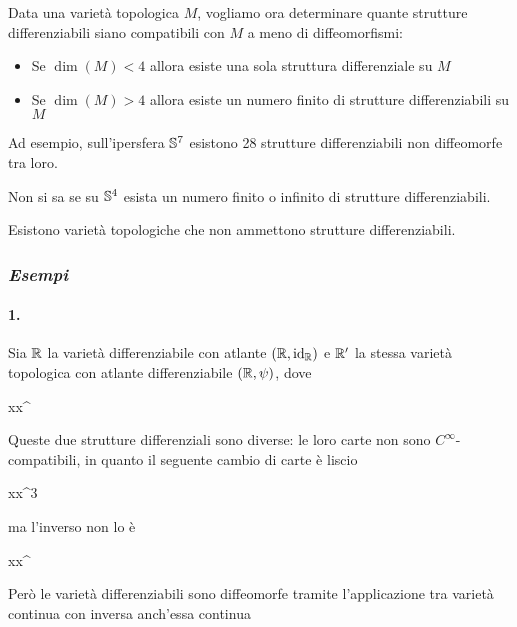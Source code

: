 Data una varietà topologica $ M $, vogliamo ora determinare quante strutture differenziabili siano compatibili con $ M $ a meno di diffeomorfismi:

\begin{itemize}
	\item Se $ \dim(M) < 4 $ allora esiste una sola struttura differenziale su $ M $
	
	\item Se $ \dim(M) > 4 $ allora esiste un numero finito di strutture differenziabili su $ M $
\end{itemize}

Ad esempio, sull'ipersfera $ \S^{7} $ esistono 28 strutture differenziabili non diffeomorfe tra loro.

\begin{remark}
	Non si sa se su $ \S^{4} $ esista un numero finito o infinito di strutture differenziabili.
\end{remark}

\begin{remark}
	Esistono varietà topologiche che non ammettono strutture differenziabili.
\end{remark}

\subsubsection{\textit{Esempi}}

\paragraph{1.}

Sia $ \R $ la varietà differenziabile con atlante $ (\R,\id_{\R}) $ e $ \R' $ la stessa varietà topologica con atlante differenziabile $ (\R,\psi) $, dove

\map{\psi}
	{\R}{\R}
	{x}{x^{}}

Queste due strutture differenziali sono diverse: le loro carte non sono $ C^{\infty} $-compatibili, in quanto il seguente cambio di carte è liscio

	{\R}{\R}
	{x}{x^{3}}

ma l'inverso non lo è
	
	{\R}{\R}
	{x}{x^{}}

Però le varietà differenziabili sono diffeomorfe tramite l'applicazione tra varietà continua con inversa anch'essa continua

